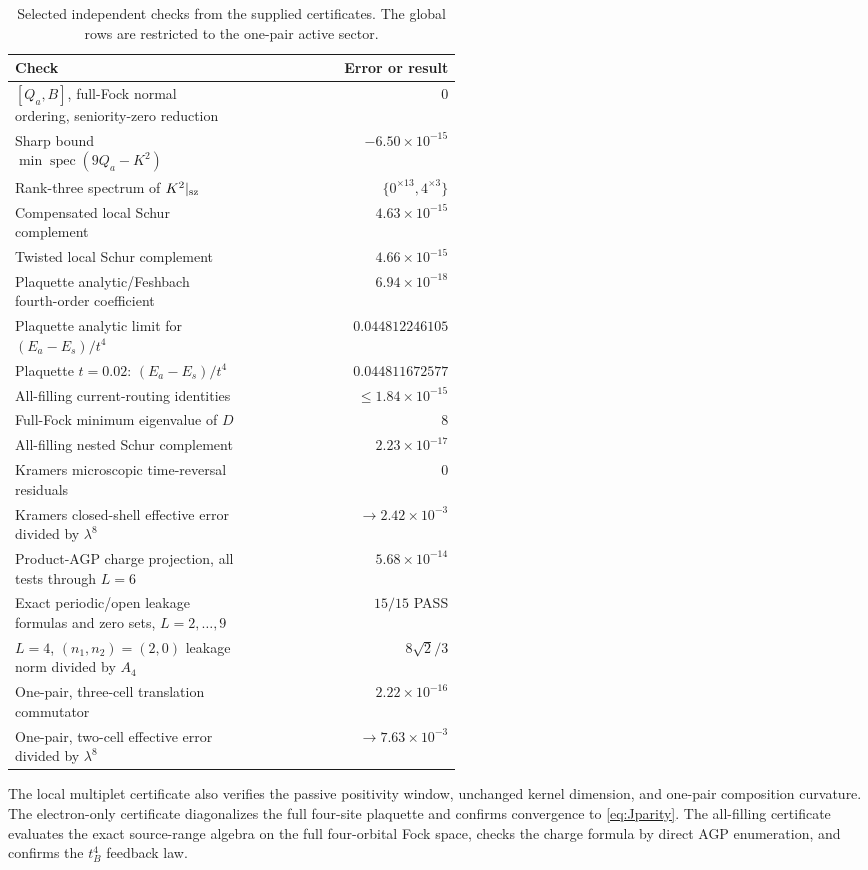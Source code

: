 \documentclass[11pt]{article}
\theoremstyle{definition}
\theoremstyle{remark}
\newcommand{\spec}{\operatorname{spec}}
\begin{document}
\begin{table}[H]
\centering
\caption{Selected independent checks from the supplied certificates.  The global rows are restricted to the one-pair active sector.}
\label{tab:certificates}
\begin{tabular}{@{}p{0.52\linewidth}r@{}}
\toprule
Check & Error or result\\
\midrule
$[Q_a,B]$, full-Fock normal ordering, seniority-zero reduction & $0$\\
Sharp bound $\min\spec(9Q_a-K^2)$ & $-6.50\times10^{-15}$\\
Rank-three spectrum of $K^2|_{\rm sz}$ & $\{0^{\times13},4^{\times3}\}$\\
Compensated local Schur complement & $4.63\times10^{-15}$\\
Twisted local Schur complement & $4.66\times10^{-15}$\\
Plaquette analytic/Feshbach fourth-order coefficient & $6.94\times10^{-18}$\\
Plaquette analytic limit for $(E_a-E_s)/t^4$ & $0.044812246105$\\
Plaquette $t=0.02$: $(E_a-E_s)/t^4$ & $0.044811672577$\\
All-filling current-routing identities & $\le1.84\times10^{-15}$\\
Full-Fock minimum eigenvalue of $D$ & $8$\\
All-filling nested Schur complement & $2.23\times10^{-17}$\\
Kramers microscopic time-reversal residuals & $0$\\
Kramers closed-shell effective error divided by $\lambda^8$ & $\to2.42\times10^{-3}$\\
Product-AGP charge projection, all tests through $L=6$ & $5.68\times10^{-14}$\\
Exact periodic/open leakage formulas and zero sets, $L=2,\ldots,9$ & $15/15$ PASS\\
$L=4$, $(n_1,n_2)=(2,0)$ leakage norm divided by $A_4$ & $8\sqrt2/3$\\
One-pair, three-cell translation commutator & $2.22\times10^{-16}$\\
One-pair, two-cell effective error divided by $\lambda^8$ & $\to7.63\times10^{-3}$\\
\bottomrule
\end{tabular}
\end{table}

The local multiplet certificate also verifies the passive positivity window, unchanged kernel dimension, and one-pair composition curvature.  The electron-only certificate diagonalizes the full four-site plaquette and confirms convergence to \eqref{eq:Jparity}.  The all-filling certificate evaluates the exact source-range algebra on the full four-orbital Fock space, checks the charge formula by direct AGP enumeration, and confirms the $t_B^4$ feedback law.
\end{document}
